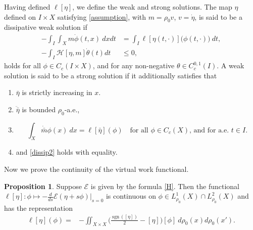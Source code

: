 \documentclass[10pt, letterpaper]{article}
\def\E{{\mathcal{E}}}
\def\H{{\mathcal{H}}}
\def\drr{{d\rho_0(x)d\rho_0(x')}}
\def\sgn{\,\textrm{sgn}\,}
\theoremstyle{definition}
\newtheorem{proposition}[subsubsection]{Proposition}
\theoremstyle{remark}
\begin{document}
Having defined $\ell[\eta]$, we define the weak and strong solutions. The map $\eta$ defined on $I\times X$ satisfying \eqref{assumption}, with $m=\rho_0 v$, $v= \dot{\eta}$,  is said to be a dissipative weak solution if 
        \begin{align}
         -\int_I\int_{X}^{}{m}\dot{\phi}(t,x) \: dxdt &= \int_I \ell{[\eta(t,\cdot)]}\big(\phi(t,\cdot)\big) \: dt, \label{wksol2}\\
            -\int_I \H[\eta, {m}]\dot{\theta}(t)dt &\leq 0, \label{dissip2}
\end{align}
holds for all $\phi \in C_c(I \times X)$, and for any non-negative $\theta\in C^{0,1}_c(I)$. A weak solution is said to be a strong solution if it additionally satisfies that
\begin{enumerate}
 \item $\bar\eta$ is strictly increasing in $x$.
 \item $\ddot{\bar\eta}$ is bounded $\rho_0$-a.e.,
 \item 
 \begin{equation}
  \int_X \dot{\bar{{m}}} \phi(x) \: dx = \ell[\bar\eta](\phi) \quad \text{for all $\phi\in C_c(X)$, and for a.e. $t\in I$.}
 \end{equation}
 \item and \eqref{dissip2} holds with equality.
\end{enumerate}
Now we prove the continuity of the virtual work functional.
\begin{proposition} \label{vw2}
 Suppose $\E$ is given by the formula \eqref{H}. Then the functional $\ell[\eta] : \phi \mapsto -\frac{d}{ds} \E(\eta + s\phi) \Big|_{s=0}$ is continuous on
  $\phi \in L^1_{\rho_0}(X) \cap L^2_{\rho_0}(X)$
 and has the representation
 \begin{equation} 
 \begin{aligned}
  \ell[\eta](\phi)=&-\iint_{X\times X} \Big(\frac{\sgn([\eta])}{2} - [\eta]\Big)[\phi]\: d\rho_0(x)d\rho_0(x').
 \end{aligned}
 \end{equation}
\end{proposition}
\end{document}
